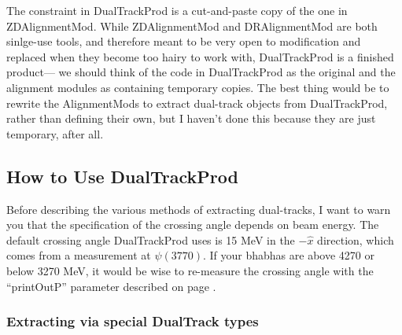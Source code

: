 \documentclass[12pt]{article}
\begin{document}
The constraint in DualTrackProd is a cut-and-paste copy of the one in
ZDAlignmentMod.  While ZDAlignmentMod and DRAlignmentMod are both
sinlge-use tools, and therefore meant to be very open to modification
and replaced when they become too hairy to work with, DualTrackProd is
a finished product--- we should think of the code in DualTrackProd as
the original and the alignment modules as containing temporary copies.
The best thing would be to rewrite the AlignmentMods to extract
dual-track objects from DualTrackProd, rather than defining their own,
but I haven't done this because they are just temporary, after all.

\subsection{How to Use DualTrackProd}

Before describing the various methods of extracting dual-tracks, I
want to warn you that the specification of the crossing angle depends
on beam energy.  The default crossing angle DualTrackProd uses is 15
MeV in the $-\hat{x}$ direction, which comes from a measurement at
$\psi(3770)$.  If your bhabhas are above 4270 or below 3270 MeV, it
would be wise to re-measure the crossing angle with the ``printOutP''
parameter described on page \pageref{printOutP}.

\subsubsection{Extracting via special DualTrack types}
\end{document}
